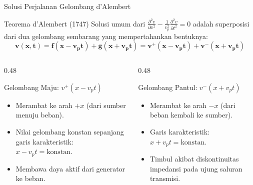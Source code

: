 \documentclass[aspectratio=169,10pt]{beamer}
\begin{document}
\begin{frame}{Solusi Perjalanan Gelombang d'Alembert}
  \begin{block}{Teorema d'Alembert (1747)}
    \small
    Solusi umum dari $\frac{\partial^2 v}{\partial x^2} - \frac{1}{v_p^2} \frac{\partial^2 v}{\partial t^2} = 0$ adalah superposisi dari dua gelombang sembarang yang mempertahankan bentuknya:
    \begin{equation*}
      \mathbf{v(x, t) = f(x - v_p t) + g(x + v_p t) = v^+(x - v_p t) + v^-(x + v_p t)}
    \end{equation*}
  \end{block}
  \begin{columns}[t]
    \begin{column}{0.48\textwidth}
      \begin{alertblock}{Gelombang Maju: $v^+(x - v_p t)$}
        \small
        \begin{itemize}
          \item Merambat ke arah $+x$ (dari sumber menuju beban).
          \item Nilai gelombang konstan sepanjang garis karakteristik: $x - v_p t = \text{konstan}$.
          \item Membawa daya aktif dari generator ke beban.
        \end{itemize}
      \end{alertblock}
    \end{column}
    \begin{column}{0.48\textwidth}
      \begin{exampleblock}{Gelombang Pantul: $v^-(x + v_p t)$}
        \small
        \begin{itemize}
          \item Merambat ke arah $-x$ (dari beban kembali ke sumber).
          \item Garis karakteristik: $x + v_p t = \text{konstan}$.
          \item Timbul akibat diskontinuitas impedansi pada ujung saluran transmisi.
        \end{itemize}
      \end{exampleblock}
    \end{column}
  \end{columns}
\end{frame}
\end{document}
